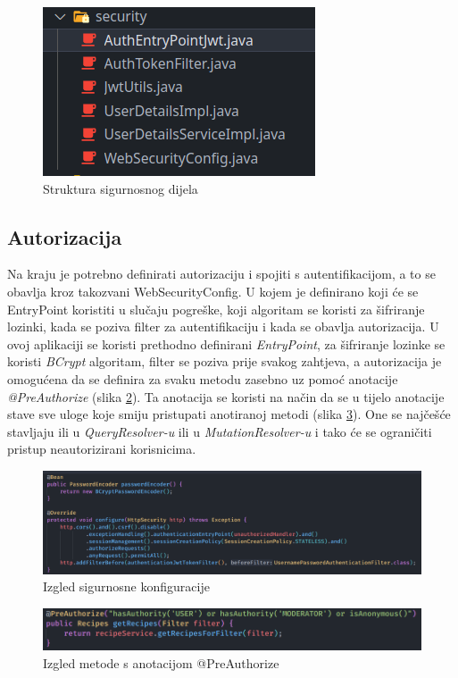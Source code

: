 \documentclass[times, utf8, zavrsni]{fer}
\begin{document}
\begin{figure}[h]
      \centering
      \includegraphics[width=.5\textwidth]{security_implementation.png}
      \caption{Struktura sigurnosnog dijela}
      \label{fig:Security}
\end{figure}

\subsection{Autorizacija}
Na kraju je potrebno definirati autorizaciju i spojiti s autentifikacijom, a to se obavlja kroz takozvani WebSecurityConfig.
U kojem je definirano koji će se EntryPoint koristiti u slučaju pogreške, koji algoritam se koristi za šifriranje lozinki,
kada se poziva filter za autentifikaciju i kada se obavlja autorizacija. U ovoj aplikaciji se koristi prethodno
definirani \textit{EntryPoint}, za šifriranje lozinke se koristi \textit{BCrypt} algoritam, filter se poziva prije svakog zahtjeva, a
autorizacija je omogućena da se definira za svaku metodu zasebno uz pomoć anotacije \textit{@PreAuthorize} (slika \ref{fig:WebSecurityConfig}).
Ta anotacija se koristi na način da se u tijelo anotacije stave sve uloge koje smiju pristupati anotiranoj metodi (slika \ref{fig:PreAuthorize}).
One se najčešće stavljaju ili u \textit{QueryResolver-u} ili u \textit{MutationResolver-u} i tako će se ograničiti pristup
neautorizirani korisnicima.
\begin{figure}[h]
      \centering
      \includegraphics[width=\textwidth]{WebSecurityConfig.png}
      \caption{Izgled sigurnosne konfiguracije}
      \label{fig:WebSecurityConfig}
\end{figure}
\begin{figure}[h]
      \centering
      \includegraphics[width=\textwidth]{PreAuthorize.png}
      \caption{Izgled metode s anotacijom @PreAuthorize}
      \label{fig:PreAuthorize}
\end{figure}
\end{document}
